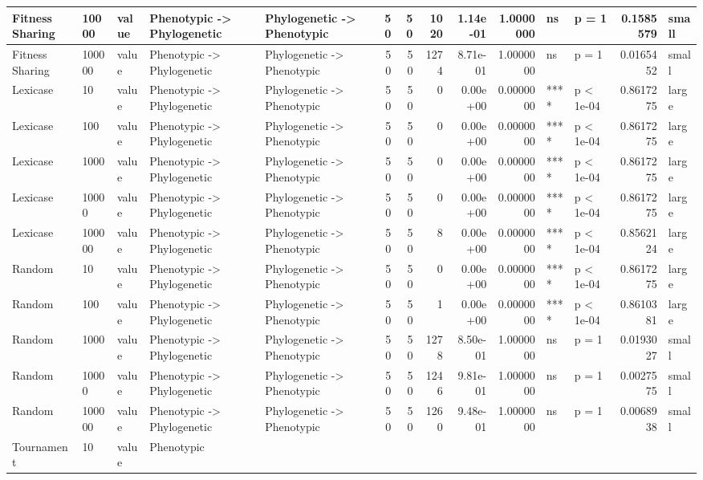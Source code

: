 \documentclass[]{book}
\begin{document}
\begin{table}
\begin{tabular}[t]{l|l|l|l|l|r|r|r|r|r|l|l|r|l}
\hline
Fitness Sharing & 10000 & value & Phenotypic
    ->
Phylogenetic & Phylogenetic
    ->
Phenotypic & 50 & 50 & 1020 & 1.14e-01 & 1.0000000 & ns & p = 1 & 0.1585579 & small\\
\hline
Fitness Sharing & 100000 & value & Phenotypic
    ->
Phylogenetic & Phylogenetic
    ->
Phenotypic & 50 & 50 & 1274 & 8.71e-01 & 1.0000000 & ns & p = 1 & 0.0165452 & small\\
\hline
Lexicase & 10 & value & Phenotypic
    ->
Phylogenetic & Phylogenetic
    ->
Phenotypic & 50 & 50 & 0 & 0.00e+00 & 0.0000000 & **** & p < 1e-04 & 0.8617275 & large\\
\hline
Lexicase & 100 & value & Phenotypic
    ->
Phylogenetic & Phylogenetic
    ->
Phenotypic & 50 & 50 & 0 & 0.00e+00 & 0.0000000 & **** & p < 1e-04 & 0.8617275 & large\\
\hline
Lexicase & 1000 & value & Phenotypic
    ->
Phylogenetic & Phylogenetic
    ->
Phenotypic & 50 & 50 & 0 & 0.00e+00 & 0.0000000 & **** & p < 1e-04 & 0.8617275 & large\\
\hline
Lexicase & 10000 & value & Phenotypic
    ->
Phylogenetic & Phylogenetic
    ->
Phenotypic & 50 & 50 & 0 & 0.00e+00 & 0.0000000 & **** & p < 1e-04 & 0.8617275 & large\\
\hline
Lexicase & 100000 & value & Phenotypic
    ->
Phylogenetic & Phylogenetic
    ->
Phenotypic & 50 & 50 & 8 & 0.00e+00 & 0.0000000 & **** & p < 1e-04 & 0.8562124 & large\\
\hline
Random & 10 & value & Phenotypic
    ->
Phylogenetic & Phylogenetic
    ->
Phenotypic & 50 & 50 & 0 & 0.00e+00 & 0.0000000 & **** & p < 1e-04 & 0.8617275 & large\\
\hline
Random & 100 & value & Phenotypic
    ->
Phylogenetic & Phylogenetic
    ->
Phenotypic & 50 & 50 & 1 & 0.00e+00 & 0.0000000 & **** & p < 1e-04 & 0.8610381 & large\\
\hline
Random & 1000 & value & Phenotypic
    ->
Phylogenetic & Phylogenetic
    ->
Phenotypic & 50 & 50 & 1278 & 8.50e-01 & 1.0000000 & ns & p = 1 & 0.0193027 & small\\
\hline
Random & 10000 & value & Phenotypic
    ->
Phylogenetic & Phylogenetic
    ->
Phenotypic & 50 & 50 & 1246 & 9.81e-01 & 1.0000000 & ns & p = 1 & 0.0027575 & small\\
\hline
Random & 100000 & value & Phenotypic
    ->
Phylogenetic & Phylogenetic
    ->
Phenotypic & 50 & 50 & 1260 & 9.48e-01 & 1.0000000 & ns & p = 1 & 0.0068938 & small\\
\hline
Tournament & 10 & value & Phenotypic

\end{tabular}
\end{table}
\end{document}
